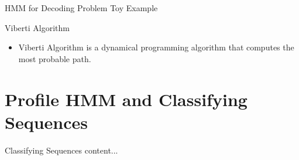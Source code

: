 \documentclass{beamer}
\begin{document}
\begin{frame}{HMM for Decoding Problem}
	Toy Example
	
\end{frame} 
\begin{frame}{Viberti Algorithm}
	\begin{itemize}
		\item Viberti Algorithm is a dynamical programming algorithm that computes the most probable path.
	\end{itemize}
\end{frame}

\section{Profile HMM and Classifying Sequences}

\begin{frame}{Classifying Sequences}
	content...
\end{frame}
\end{document}
